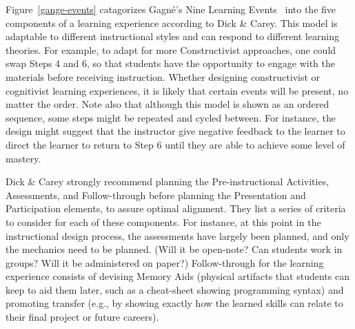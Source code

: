 
Figure~\ref{gange-events} catagorizes Gagn\'e's Nine Learning Events~\citep{gagne1985conditions} into the five components of a learning experience according to Dick \& Carey.
This model is adaptable to different instructional styles and can respond to different learning theories.
For example, to adapt for more Constructivist approaches, one could swap Steps 4 and 6, so that students have the opportunity to engage with the materials before receiving instruction.
Whether designing constructivist or cognitivist learning experiences, it is likely that certain events will be present, no matter the order.
Note also that although this model is shown as an ordered sequence, some steps might be repeated and cycled between.
For instance, the design might suggest that the instructor give negative feedback to the learner to direct the learner to return to Step 6 until they are able to achieve some level of mastery.


Dick \& Carey strongly recommend planning the Pre-instructional Activities, Assessments, and Follow-through before planning the Presentation and Participation elements, to assure optimal alignment.
They list a series of criteria to consider for each of these components.
For instance, at this point in the instructional design process, the assessments have largely been planned, and only the mechanics need to be planned. (Will it be open-note? Can students work in groups? Will it be administered on paper?)
Follow-through for the learning experience consists of devising Memory Aids (physical artifacts that students can keep to aid them later, such as a cheat-sheet showing programming syntax) and promoting transfer (e.g., by showing exactly how the learned skills can relate to their final project or future careers).

